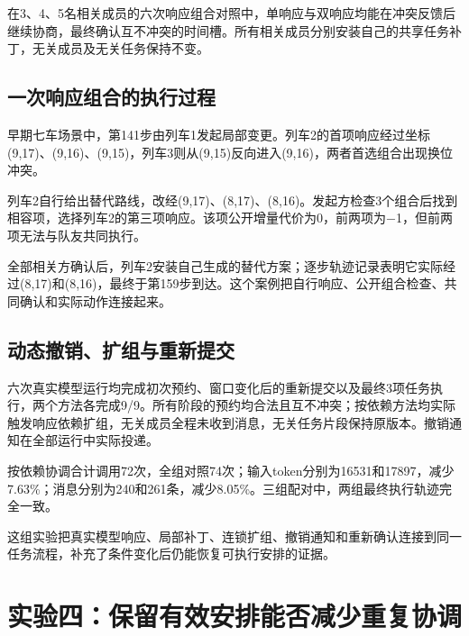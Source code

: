 在3、4、5名相关成员的六次响应组合对照中，单响应与双响应均能在冲突反馈后继续协商，最终确认互不冲突的时间槽。所有相关成员分别安装自己的共享任务补丁，无关成员及无关任务保持不变。

\hypertarget{ux4e00ux6b21ux54cdux5e94ux7ec4ux5408ux7684ux6267ux884cux8fc7ux7a0b}{%
\subsection{一次响应组合的执行过程}\label{ux4e00ux6b21ux54cdux5e94ux7ec4ux5408ux7684ux6267ux884cux8fc7ux7a0b}}

早期七车场景中，第141步由列车1发起局部变更。列车2的首项响应经过坐标(9,17)、(9,16)、(9,15)，列车3则从(9,15)反向进入(9,16)，两者首选组合出现换位冲突。

列车2自行给出替代路线，改经(9,17)、(8,17)、(8,16)。发起方检查3个组合后找到相容项，选择列车2的第三项响应。该项公开增量代价为0，前两项为−1，但前两项无法与队友共同执行。

全部相关方确认后，列车2安装自己生成的替代方案；逐步轨迹记录表明它实际经过(8,17)和(8,16)，最终于第159步到达。这个案例把自行响应、公开组合检查、共同确认和实际动作连接起来。

\hypertarget{ux52a8ux6001ux64a4ux9500ux6269ux7ec4ux4e0eux91cdux65b0ux63d0ux4ea4}{%
\subsection{动态撤销、扩组与重新提交}\label{ux52a8ux6001ux64a4ux9500ux6269ux7ec4ux4e0eux91cdux65b0ux63d0ux4ea4}}

六次真实模型运行均完成初次预约、窗口变化后的重新提交以及最终3项任务执行，两个方法各完成9/9。所有阶段的预约均合法且互不冲突；按依赖方法均实际触发响应依赖扩组，无关成员全程未收到消息，无关任务片段保持原版本。撤销通知在全部运行中实际投递。

按依赖协调合计调用72次，全组对照74次；输入token分别为16531和17897，减少7.63\%；消息分别为240和261条，减少8.05\%。三组配对中，两组最终执行轨迹完全一致。

这组实验把真实模型响应、局部补丁、连锁扩组、撤销通知和重新确认连接到同一任务流程，补充了条件变化后仍能恢复可执行安排的证据。

\hypertarget{ux94c1ux8defux8bb8ux53efux4e0eux771fux5b9eux6a21ux578bux9884ux7ea6ux6309ux9700ux534fux8c03ux6210ux672c}{%
\section{实验四：保留有效安排能否减少重复协调}\label{ux94c1ux8defux8bb8ux53efux4e0eux771fux5b9eux6a21ux578bux9884ux7ea6ux6309ux9700ux534fux8c03ux6210ux672c}}


